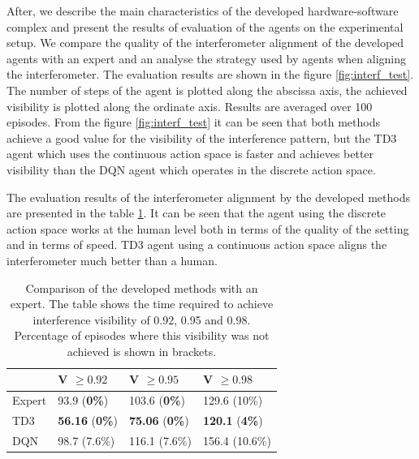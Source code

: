 After, we describe the main characteristics of the developed hardware-software complex and present the results of evaluation of the agents on the experimental setup. We compare the quality of the interferometer alignment of the developed agents with an expert and an analyse the strategy used by agents when aligning the interferometer. The evaluation results are shown in the figure \ref{fig:interf_test}. The number of steps of the agent is plotted along the abscissa axis, the achieved visibility is plotted along the ordinate axis. Results are averaged over 100 episodes. From the figure \ref{fig:interf_test} it can be seen that both methods achieve a good value for the visibility of the interference pattern, but the TD3 agent which uses the continuous action space is faster and achieves better visibility than the DQN agent which operates in the discrete action space.

The evaluation results of the interferometer alignment by the developed methods are presented in the table \ref{tab:human}. It can be seen that the agent using the discrete action space works at the human level both in terms of the quality of the setting and in terms of speed. TD3 agent using a continuous action space aligns the interferometer much better than a human.

\begin{table} [htbp]
    \centering
    \begin{threeparttable}
        \caption{Comparison of the developed methods with an expert. The table shows the time required to achieve interference visibility of 0.92, 0.95 and 0.98. Percentage of episodes where this visibility was not achieved is shown in brackets.}
        \label{tab:human}
        \begin{tabular}{| p{2.5cm} || p{2.5cm} | p{2.5cm} | p{2.5cm} |}
            \hline
            \hline
            &V $\ge 0.92$ & V $\ge 0.95$ & V $\ge 0.98$\\
            \hline
            Expert &  93.9 (\textbf{0\%})  & 103.6 (\textbf{0\%}) & 129.6 (10\%)\\
            TD3 &  \textbf{56.16} (\textbf{0\%}) & \textbf{75.06} (\textbf{0\%}) & \textbf{120.1} (\textbf{4\%})\\
            DQN &  98.7 (7.6\%) & 116.1 (7.6\%) & 156.4 (10.6\%)\\
            \hline
            \hline
        \end{tabular}
    \end{threeparttable}
\end{table}

